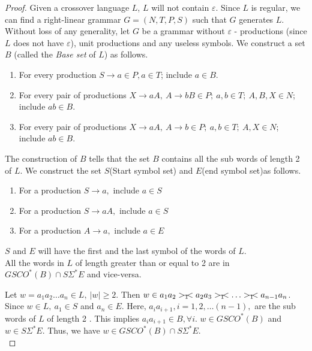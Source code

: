 \documentclass{llncs}
\newcommand{\ve}{\varepsilon}
\newcommand{\rs}{\hspace{-3.5mm}-\hspace{-2mm}<}
\begin{document}
\begin{proof}
Given a crossover language $L$, $L$ will not contain $\ve$. Since
$L$ is regular, we can find a right-linear grammar $G =(N,T,P,S)$
such that $G$ generates $L$. Without loss of any generality, let $G$
be a grammar without $\ve$ - productions (since $L$ does not have
$\ve$), unit productions and any useless symbols. We construct a set
$B$ (called the {\em Base set} of $L$) as follows.
\begin{enumerate}
\item For every production $ S \rightarrow  a  \in P,   a \in T $; include $a \in
B$.
\item For every pair of  productions $ X\rightarrow aA,~    A \rightarrow bB  \in
P;
 ~a , b\in T;~
A,B,X \in N$; include $ab \in B$.
\item For every pair of  productions $ X\rightarrow aA,~  A \rightarrow b  \in P; ~ a, b \in
T;~ A,X \in N$; include $ab \in B$.
\end{enumerate}
The construction of $B$ tells that the set $B$ contains all the sub
words of length 2 of $L$. We construct the set $S$(Start symbol set)
and $E$(end symbol set)as follows.
\begin{enumerate}
  \item    For a production $ S \rightarrow a,$ include $a \in  S$

\item For a production $ S \rightarrow aA,$ include $a \in  S$

\item For a production $ A \rightarrow a,$ include $a \in  E$
\end{enumerate}
$S$ and $E$ will have the first and the last symbol of the words of
$L$.\\

  All the words in $L$ of length greater than or equal to 2 are
 in $GSCO^*(B)  \cap S \Sigma^* E$ and vice-versa.



 Let $w  =  a_1a_2 \ldots a_n \in L,~ |w|
\geq 2$. Then $w \in a_1a_2 >_1\rs a_2a_3 >_1\rs  \ldots >_1\rs
a_{n-1}a_n$. Since $w \in L, ~a_1  \in  S$ and $a_n \in  E.$  Here,
$a_ia_{i+1}, i = 1,2, \ldots (n-1),$ are the sub words of $L$ of
length 2 .  This implies $a_ia_{i+1} \in B ,\forall i$. $w \in
GSCO^*(B)$ and $w \in S \Sigma^* E$. Thus, we have $w \in
 GSCO^*(B) \cap S \Sigma^* E$.\\


\end{proof}
\end{document}
